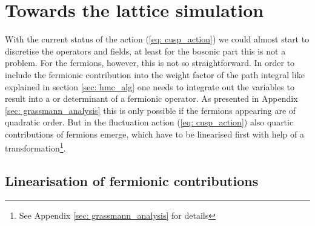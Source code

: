 \chapter{Towards the lattice simulation}
\label{sec: towards_lat}
With the current status of the action (\ref{eq: cusp_action}) we could almost start to discretise the operators and fields, at least for the bosonic part this is not a problem. For the fermions, however, this is not so straightforward. In order to include the fermionic contribution into the weight factor of the path integral like explained in section \ref{sec: hmc_alg} one needs to integrate out the  variables to result into a  or determinant of a fermionic operator. As presented in Appendix \ref{sec: grassmann_analysis} this is only possible if the fermions appearing are of quadratic order. But in the fluctuation action (\ref{eq: cusp_action}) also quartic contributions of fermions emerge, which have to be linearised first with help of a  transformation\footnote{See Appendix \ref{sec: grassmann_analysis} for details}.
%
%
%
%
%
%
\section{Linearisation of fermionic contributions}
